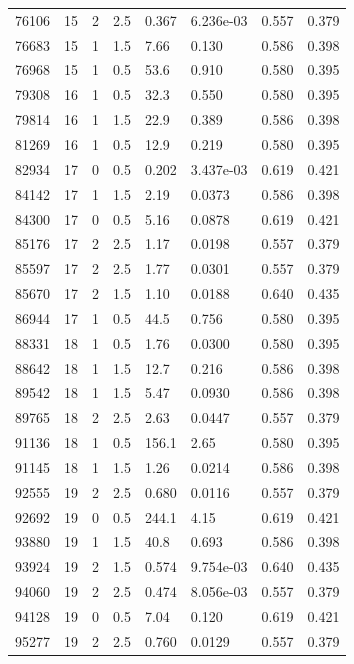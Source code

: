 \documentclass[preview]{standalone}
\begin{document}
{{{\begin{tabular}{L{1.2cm}C{1.2cm} C{0.3cm}C{0.5cm} C{1.4cm}C{1.4cm} C{1.4cm}C{1.4cm}}
  76106  &    15  & 2     & 2.5 &  0.367  & 6.236e-03  & 0.557 &  0.379   \\ 
  76683  &    15  & 1     & 1.5 &  7.66  & 0.130  & 0.586 &  0.398   \\ 
  76968  &    15  & 1     & 0.5 &  53.6  & 0.910  & 0.580 &  0.395   \\ 
  79308  &    16  & 1     & 0.5 &  32.3  & 0.550  & 0.580 &  0.395   \\ 
  79814  &    16  & 1     & 1.5 &  22.9  & 0.389  & 0.586 &  0.398   \\ 
  81269  &    16  & 1     & 0.5 &  12.9  & 0.219  & 0.580 &  0.395   \\ 
  82934  &    17  & 0     & 0.5 &  0.202  & 3.437e-03  & 0.619 &  0.421   \\ 
  84142  &    17  & 1     & 1.5 &  2.19  & 0.0373  & 0.586 &  0.398   \\ 
  84300  &    17  & 0     & 0.5 &  5.16  & 0.0878  & 0.619 &  0.421   \\ 
  85176  &    17  & 2     & 2.5 &  1.17  & 0.0198  & 0.557 &  0.379   \\ 
  85597  &    17  & 2     & 2.5 &  1.77  & 0.0301  & 0.557 &  0.379   \\ 
  85670  &    17  & 2     & 1.5 &  1.10  & 0.0188  & 0.640 &  0.435   \\ 
  86944  &    17  & 1     & 0.5 &  44.5  & 0.756  & 0.580 &  0.395   \\ 
  88331  &    18  & 1     & 0.5 &  1.76  & 0.0300  & 0.580 &  0.395   \\ 
  88642  &    18  & 1     & 1.5 &  12.7  & 0.216  & 0.586 &  0.398   \\ 
  89542  &    18  & 1     & 1.5 &  5.47  & 0.0930  & 0.586 &  0.398   \\ 
  89765  &    18  & 2     & 2.5 &  2.63  & 0.0447  & 0.557 &  0.379   \\ 
  91136  &    18  & 1     & 0.5 &  156.1  & 2.65  & 0.580 &  0.395   \\ 
  91145  &    18  & 1     & 1.5 &  1.26  & 0.0214  & 0.586 &  0.398   \\ 
  92555  &    19  & 2     & 2.5 &  0.680  & 0.0116  & 0.557 &  0.379   \\ 
  92692  &    19  & 0     & 0.5 &  244.1  & 4.15  & 0.619 &  0.421   \\ 
  93880  &    19  & 1     & 1.5 &  40.8  & 0.693  & 0.586 &  0.398   \\ 
  93924  &    19  & 2     & 1.5 &  0.574  & 9.754e-03  & 0.640 &  0.435   \\ 
  94060  &    19  & 2     & 2.5 &  0.474  & 8.056e-03  & 0.557 &  0.379   \\ 
  94128  &    19  & 0     & 0.5 &  7.04  & 0.120  & 0.619 &  0.421   \\ 
  95277  &    19  & 2     & 2.5 &  0.760  & 0.0129  & 0.557 &  0.379   \\ 
\hline 
\end{tabular} 

}}}
\end{document}
